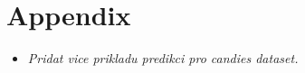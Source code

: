 \chapter*{Appendix}
\begin{itemize}
    \item \textit{Pridat vice prikladu predikci pro candies dataset.}
\end{itemize}